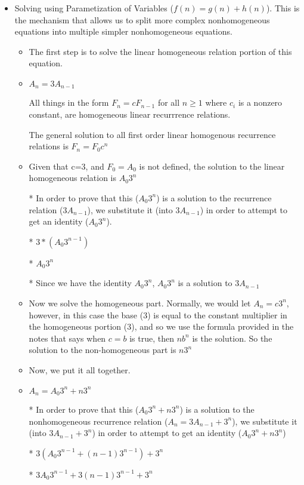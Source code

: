 \begin{enumerate}
\begin{enumerate}
\begin{itemize}
\begin{itemize}
      \end{itemize} %
    \item Solving using Parametization of Variables ($f(n)=g(n)+h(n)$). This is the mechanism that allows us to split more complex nonhomogeneous equations into multiple simpler nonhomogeneous equations.
      \begin{itemize} %
      \item The first step is to solve the linear homogeneous relation portion of this equation.
      \item $A_{n}=3A_{n-1}$
      \item [] All things in the form $F_{n}=cF_{n-1}$ for all $n\geq1$ where $c_{i}$ is a nonzero constant, are homogeneous linear recurrrence relations.
      \item [] The general solution to all first order linear homogenous recurrence relations is $F_{n}=F_{0}c^{n}$
      \item Given that c=3, and $F_{0}=A_{0}$ is not defined, the solution to the linear homogeneous relation is $A_{0}3^{n}$
      \item [*] In order to prove that this ($A_{0}3^{n}$) is a solution to the recurrence relation ($3A_{n-1}$), we substitute it (into $3A_{n-1}$) in order to attempt to get an identity ($A_{0}3^{n}$).
      \item [*] $3*(A_{0}3^{n-1})$
      \item [*] $A_{0}3^{n}$
      \item [*] Since we have the identity $A_{0}3^{n}$, $A_{0}3^{n}$ is a solution to $3A_{n-1}$
      \item Now we solve the homogeneous part. Normally, we would let $A_{n}=c3^{n}$, however, in this case the base ($3$) is equal to the constant multiplier in the homogeneous portion ($3$), and so we use the formula provided in the notes that says when $c=b$ is true, then $nb^{n}$ is the solution. So the solution to the non-homogeneous part is $n3^{n}$
      \item Now, we put it all together.
      \item $A_{n}=A_{0}3^{n} + n3^{n}$
      \item [*] In order to prove that this ($A_{0}3^{n}+n3^{n}$) is a solution to the nonhomogeneous recurrence relation ($A_{n}=3A_{n-1}+3^{n}$), we substitute it (into $3A_{n-1}+3^{n}$) in order to attempt to get an identity ($A_{0}3^{n}+n3^{n}$)
      \item [*] $3(A_{0}3^{n-1} + (n-1)3^{n-1}) + 3^{n}$
      \item [*] $3A_{0}3^{n-1} + 3(n-1)3^{n-1} + 3^{n}$

\end{itemize}
\end{itemize}
\end{enumerate}
\end{enumerate}
